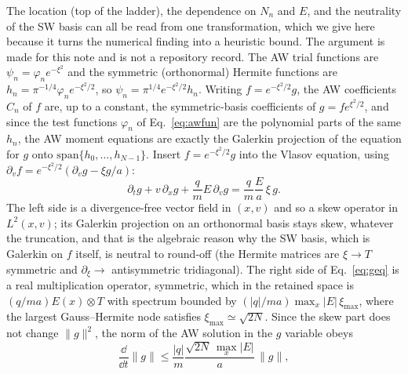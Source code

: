 The location (top of the ladder), the dependence on $N_n$ and $E$, and the neutrality of the SW basis can all be read from one transformation, which we give here because it turns the numerical finding into a heuristic bound. The argument is made for this note and is not a repository record. The AW trial functions are $\psi_n=\varphi_ne^{-\xi^2}$ and the symmetric (orthonormal) Hermite functions are $h_n=\pi^{-1/4}\varphi_ne^{-\xi^2/2}$, so $\psi_n=\pi^{1/4}e^{-\xi^2/2}h_n$. Writing $f=e^{-\xi^2/2}g$, the AW coefficients $C_n$ of $f$ are, up to a constant, the symmetric-basis coefficients of $g=fe^{\xi^2/2}$, and since the test functions $\varphi_n$ of Eq.~\eqref{eq:awfun} are the polynomial parts of the same $h_n$, the AW moment equations are exactly the Galerkin projection of the equation for $g$ onto $\mathrm{span}\{h_0,\dots,h_{N-1}\}$. Insert $f=e^{-\xi^2/2}g$ into the Vlasov equation, using $\partial_vf=e^{-\xi^2/2}(\partial_vg-\xi g/a)$:
\begin{equation}
\partial_tg+v\,\partial_xg+\frac qm E\,\partial_vg=\frac{q}{m}\frac{E}{a}\,\xi\,g .
\label{eq:geq}
\end{equation}
The left side is a divergence-free vector field in $(x,v)$ and so a skew operator in $L^2(x,v)$; its Galerkin projection on an orthonormal basis stays skew, whatever the truncation, and that is the algebraic reason why the SW basis, which is Galerkin on $f$ itself, is neutral to round-off (the Hermite matrices are $\xi\to T$ symmetric and $\partial_\xi\to$ antisymmetric tridiagonal). The right side of Eq.~\eqref{eq:geq} is a real multiplication operator, symmetric, which in the retained space is $(q/ma)E(x)\otimes T$ with spectrum bounded by $(|q|/ma)\max_x|E|\,\xi_{\max}$, where the largest Gauss--Hermite node satisfies $\xi_{\max}\simeq\sqrt{2N}$. Since the skew part does not change $\|g\|^2$, the norm of the AW solution in the $g$ variable obeys
\begin{equation}
\frac{\dd}{\dd t}\|g\|\le\frac{|q|}{m}\frac{\sqrt{2N}\,\max_x|E|}{a}\,\|g\|,
\label{eq:growthbound}
\end{equation}
